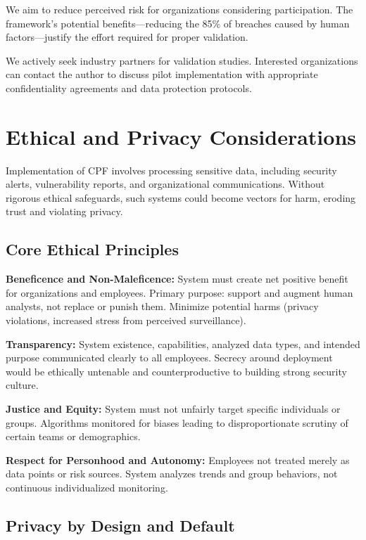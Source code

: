 \documentclass[11pt, a4paper]{article}
\begin{document}
We aim to reduce perceived risk for organizations considering participation. The framework's potential benefits—reducing the 85\% of breaches caused by human factors\cite{verizon2023}—justify the effort required for proper validation.

We actively seek industry partners for validation studies. Interested organizations can contact the author to discuss pilot implementation with appropriate confidentiality agreements and data protection protocols.

\section{Ethical and Privacy Considerations}
\label{sec:ethics}

Implementation of CPF involves processing sensitive data, including security alerts, vulnerability reports, and organizational communications. Without rigorous ethical safeguards, such systems could become vectors for harm, eroding trust and violating privacy.

\subsection{Core Ethical Principles}

\textbf{Beneficence and Non-Maleficence:} System must create net positive benefit for organizations and employees. Primary purpose: support and augment human analysts, not replace or punish them. Minimize potential harms (privacy violations, increased stress from perceived surveillance).

\textbf{Transparency:} System existence, capabilities, analyzed data types, and intended purpose communicated clearly to all employees. Secrecy around deployment would be ethically untenable and counterproductive to building strong security culture.

\textbf{Justice and Equity:} System must not unfairly target specific individuals or groups. Algorithms monitored for biases leading to disproportionate scrutiny of certain teams or demographics.

\textbf{Respect for Personhood and Autonomy:} Employees not treated merely as data points or risk sources. System analyzes trends and group behaviors, not continuous individualized monitoring.

\subsection{Privacy by Design and Default}
\end{document}
